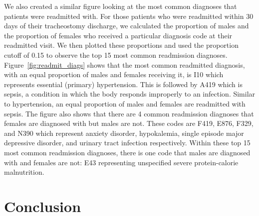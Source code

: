 \documentclass[sn-basic,pdflatex]{sn-jnl}
\theoremstyle{remark}
\theoremstyle{definition}
\begin{document}
We also created a similar figure looking at the most common diagnoses
that patients were readmitted with. For those patients who were
readmitted within 30 days of their tracheostomy discharge, we calculated
the proportion of males and the proportion of females who received a
particular diagnosis code at their readmitted visit. We then plotted
these proportions and used the proportion cutoff of 0.15 to observe the
top 15 most common readmission diagnoses.\newline \newline
Figure~\ref{fig:readmit_diags} shows that the most common readmitted
diagnosis, with an equal proportion of males and females receiving it,
is I10 which represents essential (primary) hypertension. This is
followed by A419 which is sepsis, a condition in which the body responds
improperly to an infection. Similar to hypertension, an equal proportion
of males and females are readmitted with sepsis. \newline \newline The
figure also shows that there are 4 common readmission diagnoses that
females are diagnosed with but males are not. These codes are F419,
E876, F329, and N390 which represent anxiety disorder, hypokalemia,
single episode major depressive disorder, and urinary tract infection
respectively. Within these top 15 most common readmission diagnoses,
there is one code that males are diagnosed with and females are not: E43
representing unspecified severe protein-calorie malnutrition.

\hypertarget{sec5}{%
\section{Conclusion}\label{sec5}}
\end{document}
